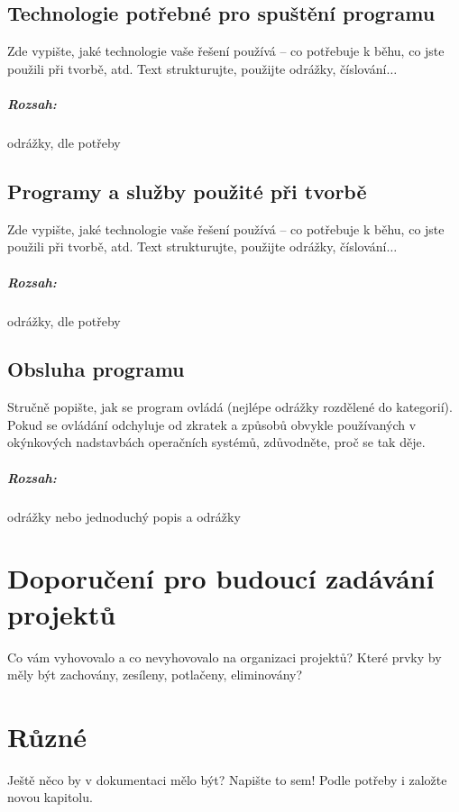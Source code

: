 \documentclass[12pt,a4paper,titlepage,final]{report}
\begin{document}
\section{Technologie potřebné pro spuštění programu}
Zde vypište, jaké technologie vaše řešení používá – co potřebuje k běhu, co
jste použili při tvorbě, atd. Text strukturujte, použijte odrážky,
číslování$\ldots$

\paragraph{Rozsah:} odrážky, dle potřeby

\section{Programy a služby použité při tvorbě}
Zde vypište, jaké technologie vaše řešení používá – co potřebuje k běhu, co
jste použili při tvorbě, atd. Text strukturujte, použijte odrážky,
číslování$\ldots$

\paragraph{Rozsah:} odrážky, dle potřeby

\section{Obsluha programu}
Stručně popište, jak se program ovládá (nejlépe odrážky rozdělené do
kategorií). Pokud se ovládání odchyluje od zkratek a způsobů obvykle
používaných v okýnkových nadstavbách operačních systémů, zdůvodněte, proč se
tak děje.

\paragraph{Rozsah:} odrážky nebo jednoduchý popis a odrážky


\chapter{Doporučení pro budoucí zadávání projektů}

Co vám vyhovovalo a co nevyhovovalo na organizaci projektů? Které prvky by měly být zachovány, zesíleny, potlačeny, eliminovány?


\chapter{Různé}

Ještě něco by v dokumentaci mělo být? Napište to sem! Podle potřeby i založte
novou kapitolu.




\nocite{cite1}
\nocite{cite2}
\nocite{cite3}


\end{document}
